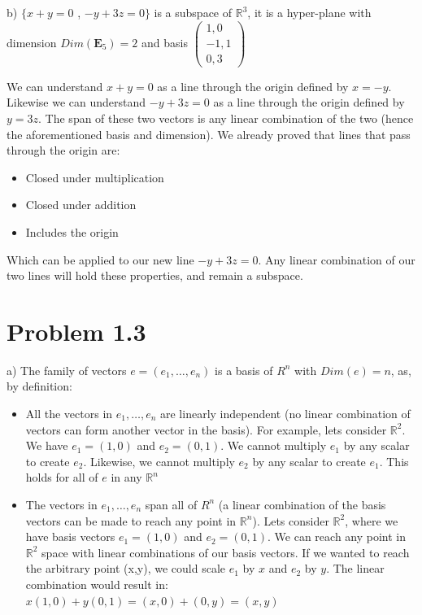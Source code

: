 \documentclass{article}
\begin{document}
b) $\{x+y=0$ , $-y+3z=0\}$ is a subspace of $\mathbb{R}^3$, it is a hyper-plane with dimension $Dim(\mathbf{E}_5)=2$ and basis $\begin{pmatrix}
1 , 0\\
-1 , 1\\
0 , 3
\end{pmatrix}$
\\
\par
We can understand $x+y=0$ as a line through the origin defined by $x=-y$. Likewise we can understand $-y+3z =0$ as a line through the origin defined by $y=3z$. The span of these two vectors is any linear combination of the two (hence the aforementioned basis and dimension). We already proved that lines that pass through the origin are:
\begin{itemize}
    \item Closed under multiplication
    \item Closed under addition
    \item Includes the origin
\end{itemize}
Which can be applied to our new line $-y+3z =0$. Any linear combination of our two lines will hold these properties, and remain a subspace.
\par


\break

\section{Problem 1.3}
a) The family of vectors $e = (e_1, \dots, e_n)$ is a basis of ${R}^n$ with $Dim(e)=n$, as, by definition:
\begin{itemize}
    \item All the vectors in $e_1,\dots,e_n$ are linearly independent (no linear combination of vectors can form another vector in the basis). For example, lets consider $\mathbb{R}^2$. We have $e_1 = (1,0)$ and $e_2 = (0,1)$. We cannot multiply $e_1$ by any scalar to create $e_2$. Likewise, we cannot multiply $e_2$ by any scalar to create $e_1$. This holds for all of $e$ in any $\mathbb{R}^n$
    \item The vectors in $e_1,\dots,e_n$ span all of ${R}^n$ (a linear combination of the basis vectors can be made to reach any point in $\mathbb{R}^n$). Lets consider $\mathbb{R}^2$, where we have basis vectors $e_1 = (1,0)$ and $e_2 = (0,1)$. We can reach any point in $\mathbb{R}^2$ space with linear combinations of our basis vectors. If we wanted to reach the arbitrary point (x,y), we could scale $e_1$ by $x$ and $e_2$ by $y$. The linear combination would result in: $x(1,0)+y(0,1) = (x,0)+(0,y) = (x,y)$
\end{itemize}\par
\end{document}
